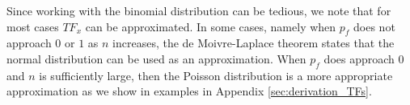 
Since working with the binomial distribution can be tedious, we note that for most cases $TF_x$ can be approximated.  In some cases, namely when $p_f$ does not approach $0$ or $1$ as $n$ increases, the de Moivre-Laplace theorem states that the normal distribution can be used as an approximation.  When $p_f$ does approach $0$ and $n$ is sufficiently large, then the Poisson distribution is a more appropriate approximation as we show in examples in Appendix \ref{sec:derivation_TFs}. 






